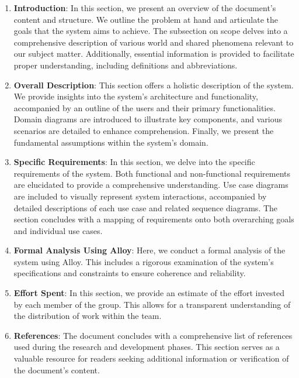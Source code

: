 \begin{enumerate}
    \item \textbf{Introduction}: In this section, we present an overview of the document's content and structure. We outline the problem at hand and articulate the goals that the system aims to achieve. The subsection on scope delves into a comprehensive description of various world and shared phenomena relevant to our subject matter. Additionally, essential information is provided to facilitate proper understanding, including definitions and abbreviations.
    \item  \textbf{Overall Description}: This section offers a holistic description of the system. We provide insights into the system's architecture and functionality, accompanied by an outline of the users and their primary functionalities. Domain diagrams are introduced to illustrate key components, and various scenarios are detailed to enhance comprehension. Finally, we present the fundamental assumptions within the system's domain.
    \item  \textbf{Specific Requirements}: In this section, we delve into the specific requirements of the system. Both functional and non-functional requirements are elucidated to provide a comprehensive understanding. Use case diagrams are included to visually represent system interactions, accompanied by detailed descriptions of each use case and related sequence diagrams. The section concludes with a mapping of requirements onto both overarching goals and individual use cases.
    \item \textbf{Formal Analysis Using Alloy}:  Here, we conduct a formal analysis of the system using Alloy. This includes a rigorous examination of the system's specifications and constraints to ensure coherence and reliability.
    \item \textbf{Effort Spent}: In this section, we provide an estimate of the effort invested by each member of the group. This allows for a transparent understanding of the distribution of work within the team.
    \item  \textbf{References}: The document concludes with a comprehensive list of references used during the research and development phases. This section serves as a valuable resource for readers seeking additional information or verification of the document's content.
\end{enumerate}
